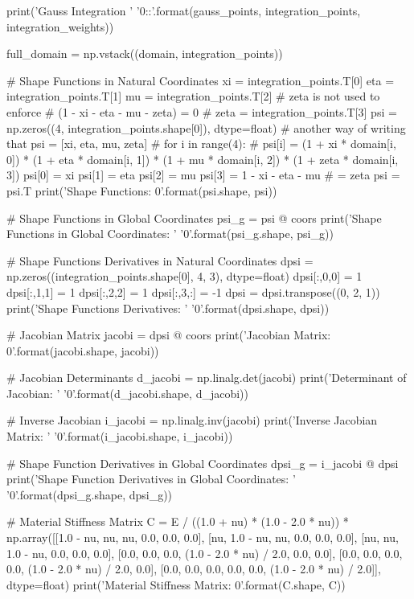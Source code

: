 \begin{python}
    print('Gauss Integration '
          '{0}:\nWeights:'.format(gauss_points,
                                            integration_points,
                                            integration_weights))

    full_domain = np.vstack((domain, integration_points))

    # Shape Functions in Natural Coordinates
    xi = integration_points.T[0]
    eta = integration_points.T[1]
    mu = integration_points.T[2]
    # zeta is not used to enforce
    # (1 - xi - eta - mu - zeta) = 0
    # zeta = integration_points.T[3]
    psi = np.zeros((4, integration_points.shape[0]), dtype=float)
    # another way of writing that psi = [xi, eta, mu, zeta]
    # for i in range(4):
    #     psi[i] = (1 + xi * domain[i, 0]) * (1 + eta * domain[i, 1]) * (1 + mu * domain[i, 2]) * (1 + zeta * domain[i, 3])
    psi[0] = xi
    psi[1] = eta
    psi[2] = mu
    psi[3] = 1 - xi - eta - mu  # = zeta
    psi = psi.T
    print('Shape Functions: {0}'.format(psi.shape, psi))

    # Shape Functions in Global Coordinates
    psi_g = psi @ coors
    print('Shape Functions in Global Coordinates: '
          '{0}'.format(psi_g.shape, psi_g))

    # Shape Functions Derivatives in Natural Coordinates
    dpsi = np.zeros((integration_points.shape[0], 4, 3), dtype=float)
    dpsi[:,0,0] = 1
    dpsi[:,1,1] = 1
    dpsi[:,2,2] = 1
    dpsi[:,3,:] = -1
    dpsi = dpsi.transpose((0, 2, 1))
    print('Shape Functions Derivatives: '
          '{0}'.format(dpsi.shape, dpsi))

    # Jacobian Matrix
    jacobi = dpsi @ coors
    print('Jacobian Matrix: {0}'.format(jacobi.shape, jacobi))

    # Jacobian Determinants
    d_jacobi = np.linalg.det(jacobi)
    print('Determinant of Jacobian: '
          '{0}'.format(d_jacobi.shape, d_jacobi))

    # Inverse Jacobian
    i_jacobi = np.linalg.inv(jacobi)
    print('Inverse Jacobian Matrix: '
          '{0}'.format(i_jacobi.shape, i_jacobi))

    # Shape Function Derivatives in Global Coordinates
    dpsi_g = i_jacobi @ dpsi
    print('Shape Function Derivatives in Global Coordinates: '
          '{0}'.format(dpsi_g.shape, dpsi_g))

    # Material Stiffness Matrix
    C = E / ((1.0 + nu) * (1.0 - 2.0 * nu)) *
        np.array([[1.0 - nu, nu, nu, 0.0, 0.0, 0.0],
                  [nu, 1.0 - nu, nu, 0.0, 0.0, 0.0],
                  [nu, nu, 1.0 - nu, 0.0, 0.0, 0.0],
                  [0.0, 0.0, 0.0, (1.0 - 2.0 * nu) / 2.0, 0.0, 0.0],
                  [0.0, 0.0, 0.0, 0.0, (1.0 - 2.0 * nu) / 2.0, 0.0],
                  [0.0, 0.0, 0.0, 0.0, 0.0, (1.0 - 2.0 * nu) / 2.0]],
                  dtype=float)
    print('Material Stiffness Matrix: {0}'.format(C.shape, C))


\end{python}
